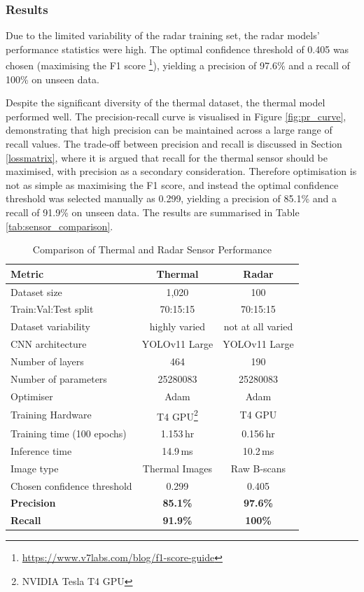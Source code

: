 \subsubsection{Results} \label{sec:cv_results_comparison}

Due to the limited variability of the radar training set, the radar models' performance statistics were high. The optimal confidence threshold of 0.405 was chosen (maximising the F1 score \footnote{\url{https://www.v7labs.com/blog/f1-score-guide}}), yielding a precision of 97.6\% and a recall of 100\% on unseen data.

Despite the significant diversity of the thermal dataset, the thermal model performed well. The precision-recall curve is visualised in Figure \ref{fig:pr_curve}, demonstrating that high precision can be maintained across a large range of recall values. The trade-off between precision and recall is discussed in Section \ref{lossmatrix}, where it is argued that recall for the thermal sensor should be maximised, with precision as a secondary consideration. Therefore optimisation is not as simple as maximising the F1 score, and instead the optimal confidence threshold was selected manually as 0.299, yielding a precision of 85.1\% and a recall of 91.9\% on unseen data. The results are summarised in Table \ref{tab:sensor_comparison}.

\begin{table}[htbp]
\centering
\caption{Comparison of Thermal and Radar Sensor Performance}
\label{tab:sensor_comparison}
\begin{tabular}{lcc}
\hline
\textbf{Metric} & \textbf{Thermal} & \textbf{Radar} \\ 
\hline
Dataset size & 1,020 & 100 \\
Train:Val:Test split & 70:15:15 & 70:15:15 \\
Dataset variability & highly varied & not at all varied \\
CNN architecture & YOLOv11 Large & YOLOv11 Large \\
Number of layers & 464 & 190 \\
Number of parameters & 25280083 & 25280083 \\
Optimiser & Adam & Adam \\
Training Hardware & T4 GPU\footnote{\label{ftn:t4gpu}NVIDIA Tesla T4 GPU} & T4 GPU\\
Training time (100 epochs) & 1.153\,hr & 0.156\,hr \\
Inference time & 14.9\,ms & 10.2\,ms \\
Image type & Thermal Images & Raw B-scans \\
Chosen confidence threshold & 0.299 & 0.405 \\
\hline
\rowcolor{gray!10} \textbf{Precision} & \textbf{85.1\%} & \textbf{97.6\%} \\
\rowcolor{gray!10} \textbf{Recall} & \textbf{91.9\%} & \textbf{100\%} \\
\hline
\end{tabular}
\end{table}


